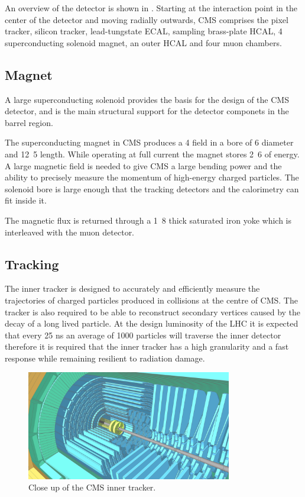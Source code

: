 An overview of the detector is shown in .
Starting at the interaction point in the center of the detector and moving
radially outwards, CMS comprises the pixel tracker, silicon tracker, lead-tungstate
ECAL, sampling brass-plate HCAL, \unit{4}{\tesla} superconducting
solenoid magnet, an outer HCAL and four muon chambers.

\subsection{Magnet}
A large superconducting solenoid provides the basis for the design of the CMS
detector, and is the main structural support for the detector componets in the
barrel region.

The superconducting magnet in CMS produces a \unit{4}{\tesla}
field in a bore of 
\unit{6}{\meter} diameter and \unit{12.5}{\meter} length.
While operating at full current the magnet stores \unit{2.6}{\giga\joule} of 
energy.
A large magnetic field is needed to give CMS a large bending power and the
ability to precisely measure the momentum of high-energy charged particles.
The solenoid bore is large enough that the tracking detectors and the
calorimetry can fit inside it.\cite{cms}

The magnetic flux is returned through a \unit{1.8}{\meter} thick saturated iron
yoke which is interleaved with the muon detector.

\subsection{Tracking}
The inner tracker is designed to accurately and efficiently measure the
trajectories of charged particles produced in collisions at the centre of CMS.
The tracker is also required to be able to reconstruct secondary vertices
caused by the decay of a long lived particle.
At the design luminosity of the LHC it is expected that every 25 ns an average
of 1000 particles will traverse the 
inner detector therefore it is required that the inner tracker has a high
granularity and a fast response while remaining resilient to radiation damage. 

\begin{figure}[htb!]
  \centering
  \includegraphics[width=0.8\textwidth]{strip.png}
  \caption{Close up of the CMS inner tracker.}
  \label{fig:tracker}
\end{figure}

